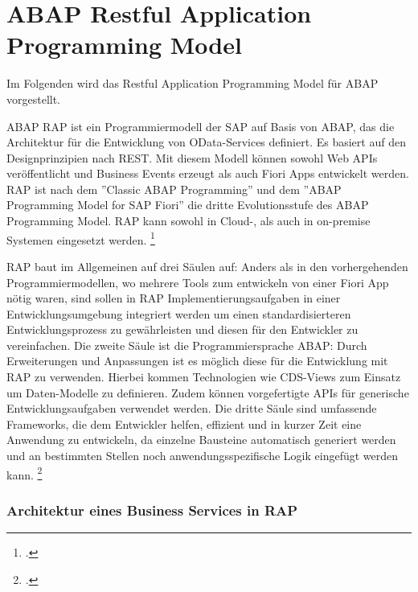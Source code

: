 \section{ABAP Restful Application Programming Model}

Im Folgenden wird das Restful Application Programming Model für ABAP vorgestellt.

ABAP RAP ist ein Programmiermodell der SAP auf Basis von ABAP, das die Architektur für die Entwicklung von OData-Services definiert. Es basiert auf den Designprinzipien nach REST. Mit diesem Modell können sowohl Web APIs veröffentlicht und Business Events erzeugt als auch Fiori Apps entwickelt werden. RAP ist nach dem ''Classic ABAP Programming'' und dem ''ABAP Programming Model for SAP Fiori'' die dritte Evolutionsstufe des ABAP Programming Model. RAP kann sowohl in Cloud-, als auch in on-premise Systemen eingesetzt werden. \footcite[Vgl.][]{sap_rap_2023}

RAP baut im Allgemeinen auf drei Säulen auf: Anders als in den vorhergehenden Programmiermodellen, wo mehrere Tools zum entwickeln von \zB einer Fiori App nötig waren, sind sollen in RAP Implementierungsaufgaben in einer Entwicklungsumgebung integriert werden um einen standardisierteren Entwicklungsprozess zu gewährleisten und diesen für den Entwickler zu vereinfachen. Die zweite Säule ist die Programmiersprache ABAP: Durch Erweiterungen und Anpassungen ist es möglich diese für die Entwicklung mit RAP zu verwenden. Hierbei kommen Technologien wie CDS-Views zum Einsatz um Daten-Modelle zu definieren. Zudem können vorgefertigte APIs für generische Entwicklungsaufgaben verwendet werden. Die dritte Säule sind umfassende Frameworks, die dem Entwickler helfen, effizient und in kurzer Zeit eine Anwendung zu entwickeln, da einzelne Bausteine automatisch generiert werden und an bestimmten Stellen noch anwendungsspezifische Logik eingefügt werden kann. \footcite[Vgl.][]{sap_rap_2023}

\subsubsection{Architektur eines Business Services in RAP}

